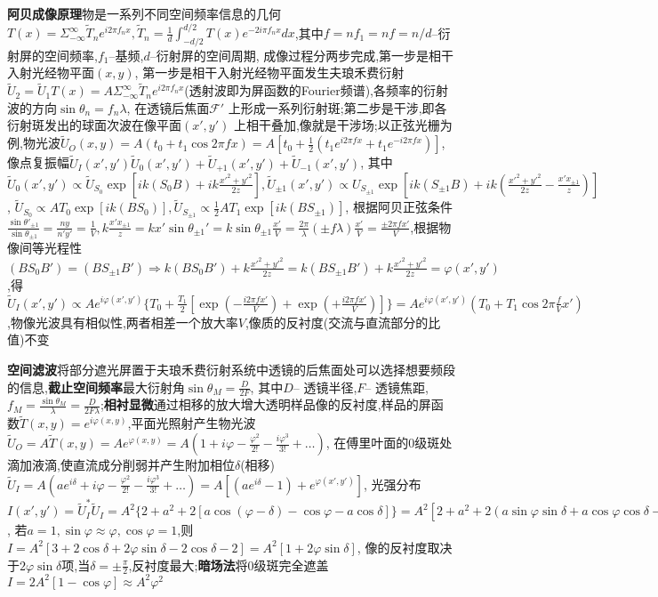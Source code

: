 \documentclass[10pt,a4paper]{article}
\begin{document}
\textbf{阿贝成像原理}物是一系列不同空间频率信息的几何$T(x)=\Sigma_{-\infty}^{\infty}\widetilde{T}_ne^{i2\pi f_nx},\widetilde{T}_n=\frac{1}{d}\int_{-d/2}^{d/2}T(x)e^{-2i\pi f_nx}dx$,其中$f=nf_1=nf=n/d$--衍射屏的空间频率,$f_1$--基频,$d$--衍射屏的空间周期, 成像过程分两步完成,第一步是相干入射光经物平面$(x,y)$, 第一步是相干入射光经物平面发生夫琅禾费衍射$\widetilde{U}_2=\widetilde{U}_1T(x)=A\Sigma_{-\infty}^{\infty}\widetilde{T}_ne^{i2\pi f_nx}$(透射波即为屏函数的Fourier频谱),各频率的衍射波的方向$\sin\theta_n=f_n\lambda$, 在透镜后焦面$\mathcal{F}'$ 上形成一系列衍射斑;第二步是干涉,即各衍射斑发出的球面次波在像平面$(x',y')$ 上相干叠加,像就是干涉场;以正弦光栅为例,物光波$\widetilde{U}_O(x,y)=A(t_0+t_1\cos2\pi fx)=A[t_0+\frac{1}{2}(t_1e^{i2\pi fx}+t_1e^{-i2\pi fx})]$,像点复振幅$\widetilde{U}_I(x',y')\widetilde{U}_0(x',y')+\widetilde{U}_{+1}(x',y')+\widetilde{U}_{-1}(x',y')$, 其中$\widetilde{U}_0(x',y')\propto\widetilde{U}_{S_0}\exp[ik(S_0B)+ik\frac{x'^2+y'^2}{2z}],\widetilde{U}_{\pm1}(x',y')\propto{U}_{S_{\pm1}}\exp[ik(S_{\pm1}B)+ik(\frac{x'^2+y'^2}{2z}-\frac{x'x_{\pm1}}{z})]$, $\widetilde{U}_{S_0}\propto AT_0\exp[ik(BS_0)],\widetilde{U}_{S_{\pm1}}\propto\frac{1}{2}AT_1\exp[ik(BS_{\pm1})]$, 根据阿贝正弦条件$\frac{\sin\theta'_{\pm1}}{\sin\theta_{\pm1}}=\frac{ny}{n'y'}=\frac{1}{V},k\frac{x'x_{\pm1}}{z}=kx'\sin\theta_{\pm1}'=k\sin\theta_{\pm1}\frac{x'}{V}=\frac{2\pi}{\lambda}(\pm f\lambda)\frac{x'}{V}=\frac{\pm2\pi fx'}{V}$,根据物像间等光程性$(BS_0B')=(BS_{\pm1}B')\Longrightarrow k(BS_0B')+k\frac{x'^2+y'^2}{2z}=k(BS_{\pm1}B')+k\frac{x'^2+y'^2}{2z}=\varphi(x',y')$ ,得$\widetilde{U}_I(x',y')\propto Ae^{i\varphi(x',y')}\{T_0+\frac{T_1}{2}[\exp(-\frac{i2\pi fx'}{V})+\exp(+\frac{i2\pi fx'}{V})]\}=Ae^{i\varphi(x',y')}(T_0+T_1\cos2\pi\frac{f}{V}x')$,物像光波具有相似性,两者相差一个放大率$V$,像质的反衬度(交流与直流部分的比值)不变

\textbf{空间滤波}将部分遮光屏置于夫琅禾费衍射系统中透镜的后焦面处可以选择想要频段的信息,\textbf{截止空间频率}最大衍射角$\sin\theta_M=\frac{D}{2F}$, 其中$D$-- 透镜半径,$F$-- 透镜焦距,$f_M=\frac{\sin\theta_M}{\lambda}=\frac{D}{2F\lambda}$;\textbf{相衬显微}通过相移的放大增大透明样品像的反衬度,样品的屏函数$\widetilde{T}(x,y)=e^{i\varphi(x,y)}$,平面光照射产生物光波$\widetilde{U}_O=A\widetilde{T}(x,y)=Ae^{\varphi(x,y)}=A(1+i\varphi-\frac{\varphi^2}{2!}-\frac{i\varphi^3}{3!}+\ldots)$, 在傅里叶面的$0$级斑处滴加液滴,使直流成分削弱并产生附加相位$\delta$(相移)$\widetilde{U}_I=A(ae^{i\delta}+i\varphi-\frac{\varphi^2}{2!}-\frac{i\varphi^3}{3!}+\ldots)=A[(ae^{i\delta}-1)+e^{\varphi(x',y')}]$, 光强分布$I(x',y')=\widetilde{U}_I^*\widetilde{U}_I=A^2\{2+a^2+2[a\cos(\varphi-\delta)-\cos\varphi-a\cos\delta]\}=A^2[2+a^2+2(a\sin\varphi\sin\delta+a\cos\varphi\cos\delta-\cos\varphi-a\cos\delta)]$, 若$a=1,\sin\varphi\approx\varphi,\cos\varphi=1$,则$I=A^2[3+2\cos\delta+2\varphi\sin\delta-2\cos\delta-2]=A^2[1+2\varphi\sin\delta]$, 像的反衬度取决于$2\varphi\sin\delta$项,当$\delta=\pm\frac{\pi}{2}$,反衬度最大;\textbf{暗场法}将$0$级斑完全遮盖$I=2A^2[1-\cos\varphi]\approx A^2\varphi^2$
\end{document}
